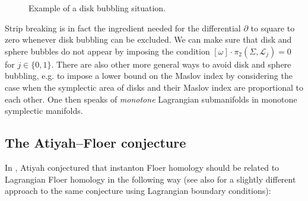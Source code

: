 \documentclass[11pt,colorinlistoftodos]{amsart}
\numberwithin{equation}{subsection}
\theoremstyle{plain}
\theoremstyle{definition}
\theoremstyle{remark}
\newcommand{\de}{\partial}
\newcommand{\calL}{\mathcal{L}}
\begin{document}
\begin{figure}[h!]
    \centering
    \caption{Example of a disk bubbling situation.}
    \label{fig:bubbling}
\end{figure}


Strip breaking is in fact the ingredient needed for the differential $\de$ to square to zero whenever disk bubbling can be excluded. We can make sure that disk and sphere bubbles do not appear by imposing the condition $[\omega]\cdot \pi_2(\Sigma,\calL_j)=0$ for $j\in\{0,1\}$. There are also other more general ways to avoid disk and sphere bubbling, e.g. to impose a lower bound on the Maslov index by considering the case when the symplectic area of disks and their Maslov index are proportional to each other. One then speaks of \emph{monotone} Lagrangian submanifolds in monotone symplectic manifolds.



\subsection{The Atiyah--Floer conjecture}
In \cite{Atiyah1987}, Atiyah conjectured that instanton Floer homology should be related to Lagrangian Floer homology in the following way (see also \cite{Salamon1995,Wehrheim2005_1,Wehrheim2005_2,SalamonWehrheim2008} for a slightly different approach to the same conjecture using Lagrangian boundary conditions):
\end{document}
